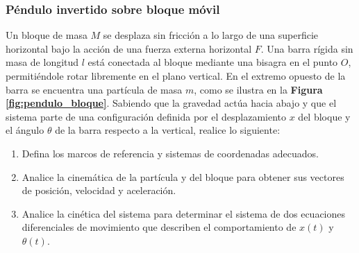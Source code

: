 \subsubsection{Péndulo invertido sobre bloque móvil}

Un bloque de masa $M$ se desplaza sin fricción a lo largo de una superficie horizontal bajo la acción de una fuerza externa horizontal $F$. Una barra rígida sin masa de longitud $l$ está conectada al bloque mediante una bisagra en el punto $O$, permitiéndole rotar libremente en el plano vertical. En el extremo opuesto de la barra se encuentra una partícula de masa $m$, como se ilustra en la \textbf{Figura \ref{fig:pendulo_bloque}}. Sabiendo que la gravedad actúa hacia abajo y que el sistema parte de una configuración definida por el desplazamiento $x$ del bloque y el ángulo $\theta$ de la barra respecto a la vertical, realice lo siguiente:

\begin{enumerate}
    \item Defina los marcos de referencia y sistemas de coordenadas adecuados.
    \item Analice la cinemática de la partícula y del bloque para obtener sus vectores de posición, velocidad y aceleración.
    \item Analice la cinética del sistema para determinar el sistema de dos ecuaciones diferenciales de movimiento que describen el comportamiento de $x(t)$ y $\theta(t)$.
\end{enumerate}

